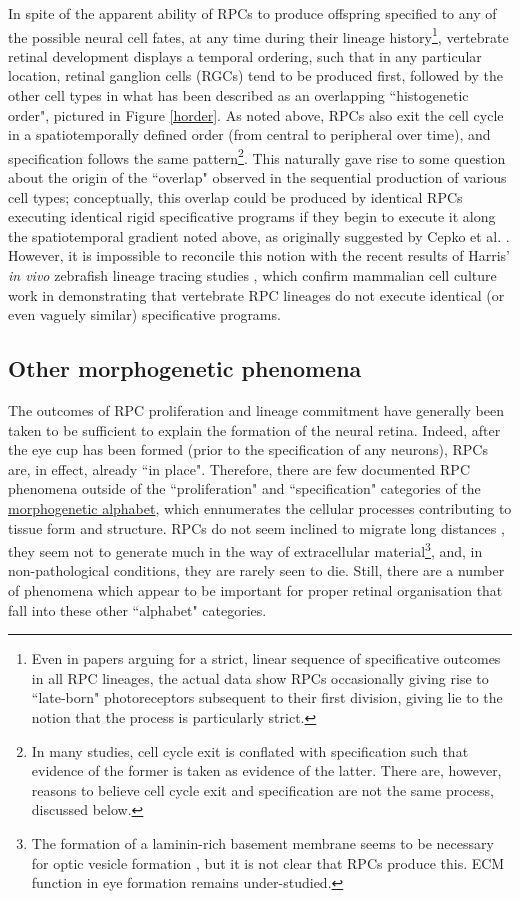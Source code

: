 In spite of the apparent ability of RPCs to produce offspring specified to any of the possible neural cell fates, at any time during their lineage history\footnote{Even in papers arguing for a strict, linear sequence of specificative outcomes in all RPC lineages, the actual data show RPCs occasionally giving rise to ``late-born" photoreceptors subsequent to their first division\cite{Wong2009}, giving lie to the notion that the process is particularly strict.}, vertebrate retinal development displays a temporal ordering, such that in any particular location, retinal ganglion cells (RGCs) tend to be produced first, followed by the other cell types in what has been described as an overlapping ``histogenetic order", pictured in Figure \ref{horder}. As noted above, RPCs also exit the cell cycle in a spatiotemporally defined order (from central to peripheral over time), and specification follows the same pattern\footnote{In many studies, cell cycle exit is conflated with specification such that evidence of the former is taken as evidence of the latter. There are, however, reasons to believe cell cycle exit and specification are not the same process, discussed below.}. This naturally gave rise to some question about the origin of the ``overlap" observed in the sequential production of various cell types; conceptually, this overlap could be produced by identical RPCs executing identical rigid specificative programs if they begin to execute it along the spatiotemporal gradient noted above, as originally suggested by Cepko et al. \cite{Cepko1996}. However, it is impossible to reconcile this notion with the recent results of Harris' \textit{in vivo} zebrafish lineage tracing studies \cite{Das2003,He2012,Boije2015}, which confirm mammalian cell culture work in demonstrating that vertebrate RPC lineages do not execute identical (or even vaguely similar) specificative programs. 

\subsection{Other morphogenetic phenomena}
The outcomes of RPC proliferation and lineage commitment have generally been taken to be sufficient to explain the formation of the neural retina. Indeed, after the eye cup has been formed (prior to the specification of any neurons), RPCs are, in effect, already ``in place". Therefore, there are few documented RPC phenomena outside of the ``proliferation" and ``specification" categories of the \hyperref[alphabet]{morphogenetic alphabet}, which ennumerates the cellular processes contributing to tissue form and structure. RPCs do not seem inclined to migrate long distances , they seem not to generate much in the way of extracellular material\footnote{The formation of a laminin-rich basement membrane seems to be necessary for optic vesicle formation \cite{Ivanovitch2013}, but it is not clear that RPCs produce this. ECM function in eye formation remains under-studied.}, and, in non-pathological conditions, they are rarely seen to die. Still, there are a number of phenomena which appear to be important for proper retinal organisation that fall into these other ``alphabet" categories.

